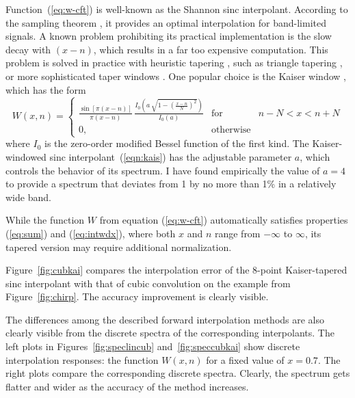 Function~(\ref{eq:w-cft}) is well-known as the Shannon sinc
interpolant. According to the sampling theorem
\cite[]{kotelnikov,shannon}, it provides an optimal interpolation for
band-limited signals.  A known problem prohibiting its practical
implementation is the slow decay with $(x - n)$, which results in a
far too expensive computation. This problem is solved in practice with
heuristic tapering \cite[]{Hale.sep.25.39}, such as triangle tapering
\cite[]{Harlan.sep.30.103}, or more sophisticated taper windows
\cite[]{wolberg}. One popular choice is the Kaiser window \cite[]{kaiser},
which has the form
\begin{equation}
  \label{eqn:kais}
  W (x, n) = \left\{\begin{array}{lcr} \displaystyle
      \frac{\sin \left[\pi (x - n) \right]}{\pi (x - n)}\,
      \frac{I_0\left(a\,\sqrt{1-\left(\frac{x-n}{N}\right)^2}\right)}
      {I_0(a)} & \mbox{for} & n - N < x < n + N \\
      0, & \mbox{otherwise} &
\end{array}\right.
\end{equation}
where $I_0$ is the zero-order modified Bessel function of the first
kind.  The Kaiser-windowed sinc interpolant~(\ref{eqn:kais}) has the
adjustable parameter $a$, which controls the behavior of its
spectrum. I have found empirically the value of $a=4$ to provide
a spectrum that deviates from 1 by no more than 1\% in a relatively
wide band.

While the function $W$ from equation (\ref{eq:w-cft}) automatically
satisfies properties (\ref{eq:sum}) and (\ref{eq:intwdx}), where both
$x$ and $n$ range from $-\infty$ to $\infty$, its tapered version may
require additional normalization.


Figure~\ref{fig:cubkai} compares the interpolation error of the
8-point Kaiser-tapered sinc interpolant with that of cubic convolution
on the example from Figure~\ref{fig:chirp}. The accuracy improvement
is clearly visible.


The differences among the described forward interpolation methods are
also clearly visible from the discrete spectra of the corresponding
interpolants.  The left plots in Figures~\ref{fig:speclincub}
and~\ref{fig:speccubkai} show discrete interpolation responses: the
function $W(x,n)$ for a fixed value of $x=0.7$. The right plots
compare the corresponding discrete spectra. Clearly, the spectrum gets
flatter and wider as the accuracy of the method increases.


